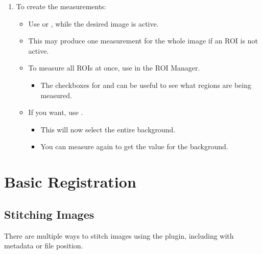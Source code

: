 \documentclass[letterpaper,10pt,english]{jupyterBook}
\begin{document}
\sphinxAtStartPar
{}
\begin{enumerate}
%
\setcounter{enumi}{1}
\item {} 
\sphinxAtStartPar
To create the measurements:
\begin{itemize}
\item {} 
\sphinxAtStartPar
Use  or , while the desired image is active.

\item {} 
\sphinxAtStartPar
This may produce one measurement for the whole image if an ROI is not active.

\item {} 
\sphinxAtStartPar
To measure all ROIs at once, use  in the ROI Manager.
\begin{itemize}
\item {} 
\sphinxAtStartPar
The checkboxes for  and  can be useful to see what regions are being measured.

\end{itemize}

\item {} 
\sphinxAtStartPar
If you want, use .
\begin{itemize}
\item {} 
\sphinxAtStartPar
This will now select the entire background.

\item {} 
\sphinxAtStartPar
You can measure again to get the value for the background.

\end{itemize}

\end{itemize}

\end{enumerate}

\sphinxstepscope


\chapter{Basic Registration}
\label{\detokenize{basic-registration:basic-registration}}\label{\detokenize{basic-registration::doc}}

\section{Stitching Images}
\label{\detokenize{basic-registration:stitching-images}}
\sphinxAtStartPar
There are multiple ways to stitch images using the  plugin, including with metadata or file position.
\end{document}
